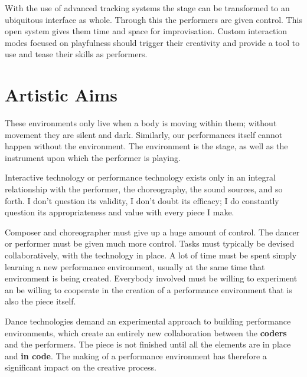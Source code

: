 With the use of advanced tracking systems the stage can be transformed to an ubiquitous interface as whole. Through this the performers are given control. This open system gives them time and space for improvisation. Custom interaction modes focused on playfulness should trigger their creativity and provide a tool to use and tease their skills as performers. 

\section{Artistic Aims}
These environments only live when a body is moving within them; without movement they are silent and dark. Similarly, our performances itself cannot happen without the environment. The environment is the stage, as well as the instrument upon which the performer is playing.

Interactive technology or performance technology exists only in an integral relationship with the performer, the choreography, the sound sources, and so forth. I don't question its validity, I don't doubt its efficacy; I do constantly question its appropriateness and value with every piece I make.

Composer and choreographer must give up a huge amount of control. The dancer or performer must be given much more control. Tasks must typically be devised collaboratively, with the technology in place. A lot of time must be spent simply learning a new performance environment, usually at the same time that environment is being created. Everybody involved must be willing to experiment an be willing to cooperate in the creation of a performance environment that is also the piece itself.

Dance technologies demand an experimental approach to building performance environments, which create an entirely new collaboration between the \textbf{coders} and the performers. The piece is not finished until all the elements are in place and \textbf{in code}. The making of a performance environment has therefore a significant impact on the creative process.

